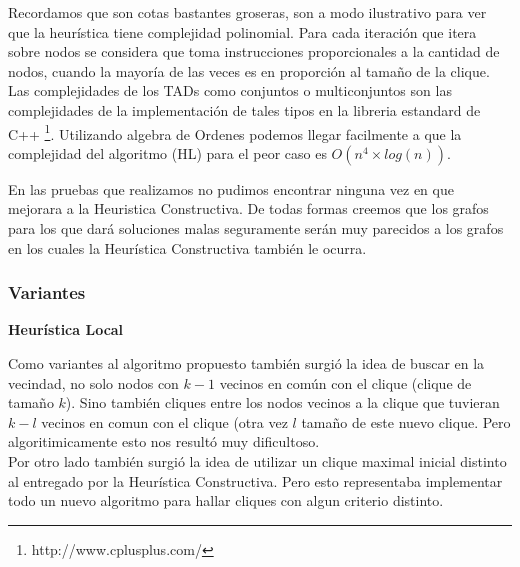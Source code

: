 Recordamos que son cotas bastantes groseras, son a modo ilustrativo para ver que la heurística tiene complejidad polinomial. Para cada iteración que itera sobre nodos se considera que toma instrucciones proporcionales a la cantidad de nodos, cuando la mayoría de las veces es en proporción al tamaño de la clique. Las complejidades de los TADs como conjuntos o multiconjuntos son las complejidades de la implementación de tales tipos en la libreria estandard de C++ \footnote{http://www.cplusplus.com/}.
Utilizando algebra de Ordenes podemos llegar facilmente a que la complejidad del algoritmo (HL) para el peor caso es $O(n^4 \times log(n)) $.

En las pruebas que realizamos no pudimos encontrar ninguna vez en que mejorara a la Heuristica Constructiva. De todas formas creemos que los grafos para los que dará soluciones malas seguramente serán muy parecidos a los grafos en los cuales la Heurística Constructiva también le ocurra.

\subsubsection{Variantes}

\textbf{Heurística Local}

Como variantes al algoritmo propuesto también surgió la idea de buscar en la vecindad, no solo nodos con  $k-1$ vecinos en común con el clique (clique de tamaño $k$). Sino también cliques entre los nodos vecinos a la clique que tuvieran $k-l$ vecinos en comun con el clique (otra vez $l$ tamaño de este nuevo clique. Pero algoritimicamente esto nos resultó muy dificultoso.
\\
Por otro lado también surgió la idea de utilizar un clique maximal inicial distinto al entregado por la Heurística Constructiva. Pero esto representaba implementar todo un nuevo algoritmo para hallar cliques con algun criterio distinto.

